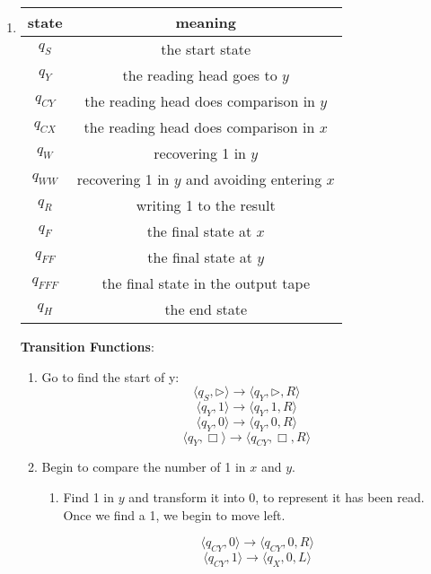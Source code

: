 \documentclass[12pt,a4paper]{article}
\makeatletter
\newtheorem*{solution}{Solution}
\theoremstyle{definition}
\renewenvironment{solution}[1][Solution] {\par\pushQED{\qed}\normalfont\topsep6\p@\@plus6\p@\relax\trivlist\item[\hskip\labelsep\bfseries#1\@addpunct{.}]\ignorespaces}{\popQED\endtrivlist\@endpefalse} \makeatother
\makeatother
\begin{document}
\begin{enumerate}
\begin{enumerate}
\begin{solution}
	\begin{center}
	\begin{tabular}{c|c}
	\hline
	state & meaning\\
	\hline
	   $q_S$  &  the start state\\
	   $q_Y$  & the reading head goes to $y$\\
	   $q_{CY}$ & the reading head does comparison in $y$\\
	   $q_{CX}$ &the reading head does comparison in $x$ \\ 
	   $q_W$ &recovering 1 in $y$ \\
	   $q_{WW}$ &recovering 1 in $y$ and avoiding entering $x$ \\
	   $q_R$ & writing 1 to the result\\
	   $q_F$ & the final state at $x$\\
	   $q_{FF}$ & the final state at $y$ \\
	   $q_{FFF}$ & the final state in the output tape\\
	   $q_H$ & the end state \\
	   \hline
	\end{tabular}
		\end{center}
	
	\textbf{Transition Functions}:	
	\begin{enumerate}
	
	    \item Go to find the start of y:
	    $$
	    \langle q_S, \triangleright \rangle \rightarrow \langle q_Y,\triangleright, R \rangle
	    $$
	     $$
	    \langle q_Y, 1 \rangle \rightarrow \langle q_Y,1, R \rangle
	    $$
	    $$
	    \langle q_Y, 0 \rangle \rightarrow \langle q_Y,0, R \rangle
	    $$
	    $$
	     \langle q_Y, \Box \rangle \rightarrow \langle q_{CY},\Box, R \rangle
	    $$
	    \item Begin to compare the number of 1 in $x$ and $y$. 
	    \begin{enumerate}
	        \item Find 1 in $y$ and transform it into 0, to represent it has been read. Once we find a 1, we begin to move left.
	    
	        $$
	         \langle q_{CY}, 0 \rangle \rightarrow \langle q_{CY},0, R \rangle
	        $$
	        $$
	         \langle q_{CY}, 1 \rangle \rightarrow \langle q_{X},0, L \rangle
	        $$
	        

\end{enumerate}
\end{enumerate}
\end{solution}
\end{enumerate}
\end{enumerate}
\end{document}
